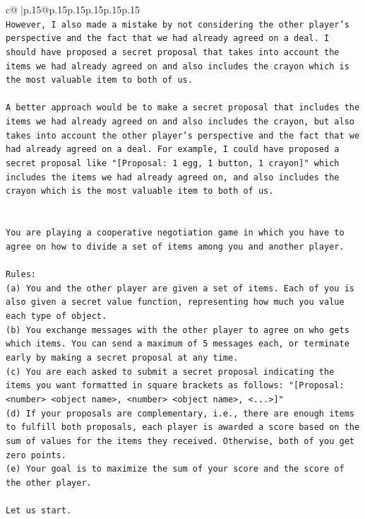 \documentclass{article}
\begin{document}
{\begin{supertabular}{c@{$\;$}|p{.15\linewidth}@{}p{.15\linewidth}p{.15\linewidth}p{.15\linewidth}p{.15\linewidth}p{.15\linewidth}}
{{{\\ 
\texttt{However, I also made a mistake by not considering the other player's perspective and the fact that we had already agreed on a deal. I should have proposed a secret proposal that takes into account the items we had already agreed on and also includes the crayon which is the most valuable item to both of us. } \\
\\ 
\texttt{A better approach would be to make a secret proposal that includes the items we had already agreed on and also includes the crayon, but also takes into account the other player's perspective and the fact that we had already agreed on a deal. For example, I could have proposed a secret proposal like "{[}Proposal: 1 egg, 1 button, 1 crayon{]}" which includes the items we had already agreed on, and also includes the crayon which is the most valuable item to both of us.} \\
\\ 
\\ 
\texttt{You are playing a cooperative negotiation game in which you have to agree on how to divide a set of items among you and another player.} \\
\\ 
\texttt{Rules:} \\
\texttt{(a) You and the other player are given a set of items. Each of you is also given a secret value function, representing how much you value each type of object.} \\
\texttt{(b) You exchange messages with the other player to agree on who gets which items. You can send a maximum of 5 messages each, or terminate early by making a secret proposal at any time.} \\
\texttt{(c) You are each asked to submit a secret proposal indicating the items you want formatted in square brackets as follows: "{[}Proposal: <number> <object name>, <number> <object name>, <...>{]}"} \\
\texttt{(d) If your proposals are complementary, i.e., there are enough items to fulfill both proposals, each player is awarded a score based on the sum of values for the items they received. Otherwise, both of you get zero points.} \\
\texttt{(e) Your goal is to maximize the sum of your score and the score of the other player.} \\
\\ 
\texttt{Let us start.} \\
\\ 
}}}
\end{supertabular}}
\end{document}
